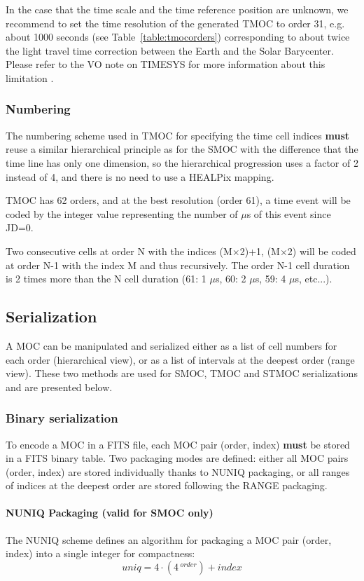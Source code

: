 \documentclass[11pt,a4paper]{ivoa}
\begin{document}
In the case that the time scale and the time reference position are unknown,
we recommend to set the time resolution of the generated TMOC to order
31, e.g. about 1000 seconds (see Table~\ref{table:tmocorders}) corresponding
to about twice the light travel time correction between the Earth and
the Solar Barycenter. Please refer to the VO note on TIMESYS for more
information about this limitation \citep{timesysnote}.


\subsubsection{Numbering}
The numbering scheme used in TMOC for specifying the time cell indices
{\bf must} reuse a similar hierarchical principle as for the SMOC
with the difference that the time line has only one dimension, so the
hierarchical progression uses a factor of 2 instead of 4, and there is
no need to use a HEALPix mapping.

TMOC has 62 orders, and at the best
resolution (order 61), a time event will be coded by the integer value
representing the number of $\mu$s of this event since JD=0.

Two consecutive cells at order N with the indices
  (M$\times$2)+1, (M$\times$2) will be coded at order N-1 with the index
  M and thus recursively. The order N-1 cell duration is 2 times more 
  than the N cell duration (61: 1 $\mu$s, 60: 2 $\mu$s, 59: 4 $\mu$s, etc...).

\subsection{Serialization}
A MOC can be manipulated and serialized either as a list of cell
numbers for each order (hierarchical view), or as a list of intervals
at the deepest order (range view). These two methods are used for
SMOC, TMOC and STMOC serializations and are presented below.

\subsubsection{Binary serialization}
To encode a MOC in a FITS file, each MOC pair (order, index) {\bf
  must} be stored in a FITS binary table. Two packaging modes are
defined: either all MOC pairs (order, index) are stored individually
thanks to NUNIQ packaging, or all ranges of indices at the deepest
order are stored following the RANGE packaging.

\paragraph{NUNIQ Packaging (valid for SMOC only)}
The NUNIQ scheme defines an algorithm for packaging a MOC pair (order,
index) into a single integer for compactness:
$$
    \textit{uniq} = 4 \cdot (4\,^\textit{order}) + \textit{index}
$$
\end{document}
